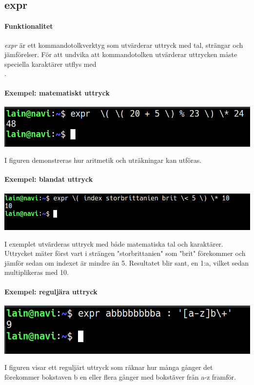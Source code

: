\subsection{expr}
\paragraph{Funktionalitet}
\emph{expr} är ett kommandotolkverktyg som utvärderar uttryck med tal, strängar och jämförelser. För att undvika att kommandotolken utvärderar uttrycken måste speciella karaktärer utflys med \\. 
\paragraph{Exempel: matematiskt uttryck}
\begin{center}
        \includegraphics[width=\linewidth]{bilder/expr_matte.png}
\end{center}
I figuren demonstreras hur aritmetik och uträkningar kan utföras.
\paragraph{Exempel: blandat uttryck}
\begin{center}
        \includegraphics[width=\linewidth]{bilder/expr_blandat.png}
\end{center}
I exemplet utvärderas uttryck med både matematiska tal och karaktärer. Uttrycket mäter först vart i strängen "storbrittanien" som "brit" förekommer och jämför sedan om indexet är mindre än 5. Resultatet blir sant, en 1:a, vilket sedan multiplikeras med 10.  
\paragraph{Exempel: reguljära uttryck}
\begin{center}
        \includegraphics[width=\linewidth]{bilder/expr_regular.png}
\end{center}
I figuren visar ett reguljärt uttryck som räknar hur många gånger det förekommer bokstaven b en eller flera gånger med bokstäver från a-z framför.
